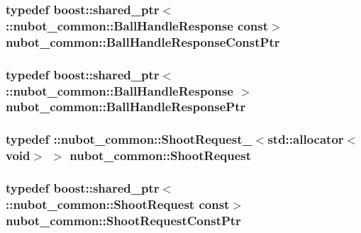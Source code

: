 \hypertarget{namespacenubot__common_aa7fc00ffdb3275b8611d9385a276bae0}{
\subsubsection[{Ball\-Handle\-Response\-Const\-Ptr}]{\setlength{\rightskip}{0pt plus 5cm}typedef boost\-::shared\-\_\-ptr$<$ \-::{\bf nubot\-\_\-common\-::\-Ball\-Handle\-Response} const$>$ {\bf nubot\-\_\-common\-::\-Ball\-Handle\-Response\-Const\-Ptr}}}\label{namespacenubot__common_aa7fc00ffdb3275b8611d9385a276bae0}
\hypertarget{namespacenubot__common_a5dc998c69f3170b6a93ed0a818a74cc9}{
\subsubsection[{Ball\-Handle\-Response\-Ptr}]{\setlength{\rightskip}{0pt plus 5cm}typedef boost\-::shared\-\_\-ptr$<$ \-::{\bf nubot\-\_\-common\-::\-Ball\-Handle\-Response} $>$ {\bf nubot\-\_\-common\-::\-Ball\-Handle\-Response\-Ptr}}}\label{namespacenubot__common_a5dc998c69f3170b6a93ed0a818a74cc9}
\hypertarget{namespacenubot__common_ab115c969a87ffc5940d2f26488a5baa3}{
\subsubsection[{Shoot\-Request}]{\setlength{\rightskip}{0pt plus 5cm}typedef \-::{\bf nubot\-\_\-common\-::\-Shoot\-Request\-\_\-}$<$std\-::allocator$<$void$>$ $>$ {\bf nubot\-\_\-common\-::\-Shoot\-Request}}}\label{namespacenubot__common_ab115c969a87ffc5940d2f26488a5baa3}
\hypertarget{namespacenubot__common_af6ec3e639ec8410eff9da8b559df3952}{
\subsubsection[{Shoot\-Request\-Const\-Ptr}]{\setlength{\rightskip}{0pt plus 5cm}typedef boost\-::shared\-\_\-ptr$<$ \-::{\bf nubot\-\_\-common\-::\-Shoot\-Request} const$>$ {\bf nubot\-\_\-common\-::\-Shoot\-Request\-Const\-Ptr}}}\label{namespacenubot__common_af6ec3e639ec8410eff9da8b559df3952}
